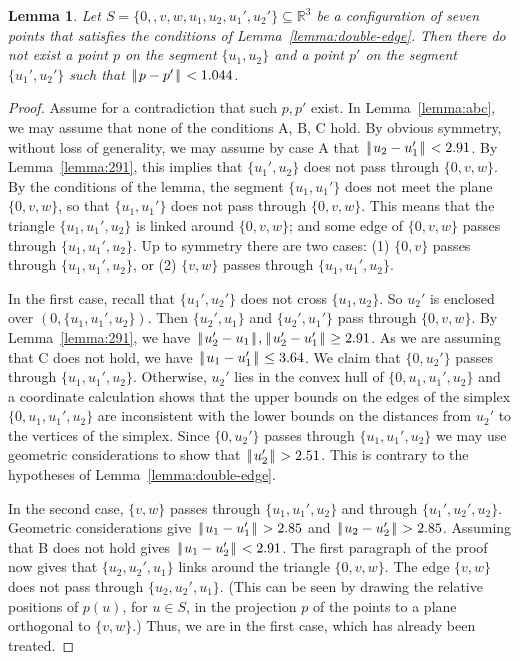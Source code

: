 \documentclass[11pt]{amsart}
\newcommand{\ring}[1]{\mathbb{#1}}
\def\|{{\hskip0.1em|\hskip-0.15em|\hskip0.1em}}
\let\subset=\subseteq
\newtheorem{lemma}{Lemma}
\begin{document}
\begin{lemma}\label{lemma:7big}  
Let $S=\{0,,v,w,u_1,u_2,u_1',u_2'\}\subset\ring{R}^3$
be a configuration of seven points that satisfies
the conditions of Lemma~\ref{lemma:double-edge}.  Then there do not exist
a point $p$ on the segment $\{u_1,u_2\}$ and  a point $p'$ on the segment
$\{u_1',u_2'\}$ such that $\|p-p'\|<1.044$.
\end{lemma}

\begin{proof}  Assume for a contradiction that such $p,p'$ exist.
In Lemma~\ref{lemma:abc}, we may assume that none of the
conditions A, B, C hold.  By obvious symmetry, without loss of generality, we may assume by case A
that $\|u_2-u_1'\|<2.91$.  By Lemma~\ref{lemma:291}, this implies that $\{u_1',u_2\}$ does not pass through $\{0,v,w\}$.  By the conditions of the lemma, the segment $\{u_1,u_1'\}$ does not meet the plane $\{0,v,w\}$, so that $\{u_1,u_1'\}$ does not pass through $\{0,v,w\}$.  This means that the triangle $\{u_1,u_1',u_2\}$ is linked around $\{0,v,w\}$; and  some edge of $\{0,v,w\}$ passes through $\{u_1,u_1',u_2\}$.  Up to symmetry there are two cases: (1) $\{0,v\}$ passes through $\{u_1,u_1',u_2\}$, or (2) $\{v,w\}$ passes through $\{u_1,u_1',u_2\}$.

In the first case, recall that $\{u_1',u_2'\}$ does not cross $\{u_1,u_2\}$.
So $u_2'$ is enclosed over $(0,\{u_1,u_1',u_2\})$.  Then $\{u_2',u_1\}$
and $\{u_2',u_1'\}$ pass through $\{0,v,w\}$.  By Lemma~\ref{lemma:291}, we
have $\|u_2'-u_1\|,\|u_2'-u_1'\|\ge 2.91$.  As we are assuming that C does not hold, we have $\|u_1-u_1'\|\le 3.64$.  We claim that $\{0,u_2'\}$
passes through $\{u_1,u_1',u_2\}$.  Otherwise, $u_2'$ lies in the convex hull of $\{0,u_1,u_1',u_2\}$ and a coordinate calculation shows that the upper bounds on the edges of the simplex $\{0,u_1,u_1',u_2\}$ are inconsistent with the lower bounds on the distances from $u_2'$ to the vertices of the simplex.  Since $\{0,u_2'\}$ passes through $\{u_1,u_1',u_2\}$ we may use geometric considerations to show that $\|u_2'\| > 2.51$.  This is contrary to the hypotheses of Lemma~\ref{lemma:double-edge}.

In the second case, $\{v,w\}$ passes through $\{u_1,u_1',u_2\}$ and through $\{u_1',u_2',u_2\}$.  Geometric considerations give $\|u_1-u_1'\|>2.85$ and $\|u_2-u_2'\|> 2.85$.  Assuming that B does not hold gives $\|u_1-u_2'\|< 2.91$.  The first paragraph of the proof now gives that $\{u_2,u_2',u_1\}$ links around the triangle $\{0,v,w\}$.  The edge $\{v,w\}$ does not pass through $\{u_2,u_2',u_1\}$.  (This can be seen by drawing the relative positions of $p(u)$, for $u\in S$, in the projection $p$ of the points to a plane orthogonal to $\{v,w\}$.)  Thus, we are in the first case, which has already been treated.
\end{proof}
\end{document}
